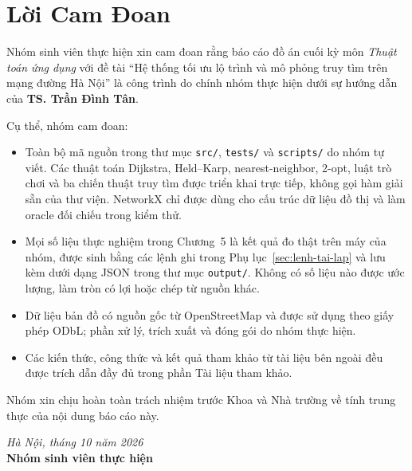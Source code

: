 \chapter*{Lời Cam Đoan}

Nhóm sinh viên thực hiện xin cam đoan rằng báo cáo đồ án cuối kỳ môn
\textit{Thuật toán ứng dụng} với đề tài ``Hệ thống tối ưu lộ trình và mô phỏng
truy tìm trên mạng đường Hà Nội'' là công trình do chính nhóm thực hiện dưới sự
hướng dẫn của \textbf{TS. Trần Đình Tân}.

Cụ thể, nhóm cam đoan:
\begin{itemize}
  \item Toàn bộ mã nguồn trong thư mục \texttt{src/}, \texttt{tests/} và
  \texttt{scripts/} do nhóm tự viết. Các thuật toán Dijkstra, Held--Karp,
  nearest-neighbor, 2-opt, luật trò chơi và ba chiến thuật truy tìm được triển
  khai trực tiếp, không gọi hàm giải sẵn của thư viện. NetworkX chỉ được dùng cho
  cấu trúc dữ liệu đồ thị và làm oracle đối chiếu trong kiểm thử.
  \item Mọi số liệu thực nghiệm trong Chương~5 là kết quả đo thật trên máy của
  nhóm, được sinh bằng các lệnh ghi trong Phụ lục~\ref{sec:lenh-tai-lap} và lưu
  kèm dưới dạng JSON trong thư mục \texttt{output/}. Không có số liệu nào được
  ước lượng, làm tròn có lợi hoặc chép từ nguồn khác.
  \item Dữ liệu bản đồ có nguồn gốc từ OpenStreetMap và được sử dụng theo giấy
  phép ODbL; phần xử lý, trích xuất và đóng gói do nhóm thực hiện.
  \item Các kiến thức, công thức và kết quả tham khảo từ tài liệu bên ngoài đều
  được trích dẫn đầy đủ trong phần Tài liệu tham khảo.
\end{itemize}

Nhóm xin chịu hoàn toàn trách nhiệm trước Khoa và Nhà trường về tính trung thực
của nội dung báo cáo này.

\begin{flushright}
\textit{Hà Nội, tháng 10 năm 2026}\\[0.5cm]
\textbf{Nhóm sinh viên thực hiện}
\end{flushright}
\clearpage
